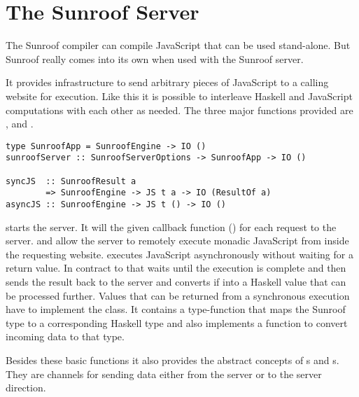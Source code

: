  
\section{The Sunroof Server}
\label{sec:server}

The Sunroof compiler can compile JavaScript that can be used
stand-alone. But Sunroof really comes
into its own when used with the Sunroof server.

It provides infrastructure to send arbitrary pieces 
of JavaScript to a calling website for execution. 
Like this it is possible to interleave Haskell and JavaScript 
computations with each other as needed. The three major functions
provided are ,  and .
\begin{verbatim}
type SunroofApp = SunroofEngine -> IO ()
sunroofServer :: SunroofServerOptions -> SunroofApp -> IO ()

syncJS  :: SunroofResult a 
        => SunroofEngine -> JS t a -> IO (ResultOf a)
asyncJS :: SunroofEngine -> JS t () -> IO ()
\end{verbatim}
 starts the server.
It will the given callback function () 
for each request to the server.
 and  allow the server
to remotely execute monadic JavaScript from inside the 
requesting website.
 executes JavaScript asynchronously without 
waiting for a return value. In contract to that 
 waits until the execution is complete and
then sends the result back to the server and converts if 
into a Haskell value that can be processed further. 
Values that can be returned from a synchronous execution 
have to implement the  class. It contains a type-function
 that maps the 
Sunroof type to a corresponding Haskell type and also 
implements a function to convert incoming data to that 
type.

Besides these basic functions it also provides the abstract 
concepts of s and s. They are 
channels for sending data either from the server or to
the server direction.


